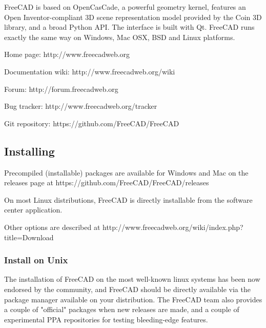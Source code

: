 FreeCAD is based on OpenCasCade, a powerful geometry kernel, features an Open Inventor-compliant 3D scene representation model provided by the Coin 3D library, and a broad Python API. The interface is built with Qt. FreeCAD runs exactly the same way on Windows, Mac OSX, BSD and Linux platforms.

Home page: http://www.freecadweb.org

Documentation wiki: http://www.freecadweb.org/wiki

Forum: http://forum.freecadweb.org

Bug tracker: http://www.freecadweb.org/tracker

Git repository: https://github.com/FreeCAD/FreeCAD

\subsection{Installing}

Precompiled (installable) packages are available for Windows and Mac on the releases page at https://github.com/FreeCAD/FreeCAD/releases

On most Linux distributions, FreeCAD is directly installable from the software center application.

Other options are described at http://www.freecadweb.org/wiki/index.php?title=Download

\subsubsection{Install on Unix}
The installation of FreeCAD on the most well-known linux systems has been now endorsed by the community, and FreeCAD should be directly available via the package manager available on your distribution. The FreeCAD team also provides a couple of "official" packages when new releases are made, and a couple of experimental PPA repositories for testing bleeding-edge features.

